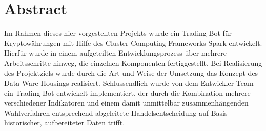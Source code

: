 \section{Abstract}

Im Rahmen dieses hier vorgestellten Projekts wurde ein Trading Bot für Kryptowährungen mit Hilfe des Cluster Computing Frameworks Spark entwickelt. Hierfür wurde in einem aufgeteilten Entwicklungsprozess über mehrere Arbeitsschritte hinweg, die einzelnen Komponenten fertiggestellt. Bei Realisierung des Projektziels wurde durch die Art und Weise der Umsetzung das Konzept des Data Ware Housings realisiert. Schlussendlich wurde von dem Entwickler Team ein Trading Bot entwickelt implementiert, der durch die Kombination mehrere verschiedener Indikatoren und einem damit unmittelbar zusammenhängenden Wahlverfahren entsprechend abgeleitete Handelsentscheidung auf Basis historischer, aufbereiteter Daten trifft. 